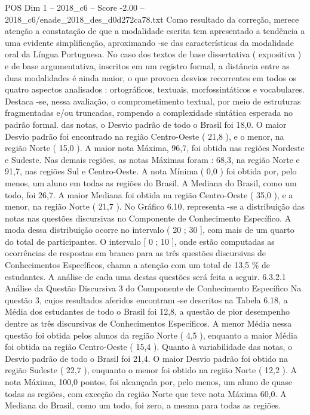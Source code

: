 \begin{textsample}{POS Dim 1 – 2018\_c6 – Score -2.00 – 2018\_c6/enade\_2018\_des\_d0d272ca78.txt}
Como resultado da correção, merece atenção a constatação de que a modalidade escrita tem apresentado a tendência a uma evidente simplificação, aproximando -se das características da modalidade oral da Língua Portuguesa.
No caso dos textos de base dissertativa ( expositiva ) e de base argumentativa, inscritos em um registro formal, a distância entre as duas modalidades é ainda maior, o que provoca desvios recorrentes em todos os quatro aspectos analisados : ortográficos, textuais, morfossintáticos e vocabulares.
Destaca -se, nessa avaliação, o comprometimento textual, por meio de estruturas fragmentadas e/ou truncadas, rompendo a complexidade sintática esperada no padrão formal. das notas, o Desvio padrão de todo o Brasil foi 18,0.
O maior Desvio padrão foi encontrado na região Centro-Oeste ( 21,8 ), e o menor, na região Norte ( 15,0 ).
A maior nota Máxima, 96,7, foi obtida nas regiões Nordeste e Sudeste.
Nas demais regiões, as notas Máximas foram : 68,3, na região Norte e 91,7, nas regiões Sul e Centro-Oeste.
A nota Mínima ( 0,0 ) foi obtida por, pelo menos, um aluno em todas as regiões do Brasil.
A Mediana do Brasil, como um todo, foi 26,7.
A maior Mediana foi obtida na região Centro-Oeste ( 35,0 ), e a menor, na região Norte ( 21,7 ).
No Gráfico 6.10, representa -se a distribuição das notas nas questões discursivas no Componente de Conhecimento Específico.
A moda dessa distribuição ocorre no intervalo ( 20 ; 30 ], com mais de um quarto do total de participantes.
O intervalo [ 0 ; 10 ], onde estão computadas as ocorrências de respostas em branco para as três questões discursivas de Conhecimentos Específicos, chama a atenção com um total de 13,5 \% de estudantes.
A análise de cada uma destas questões será feita a seguir. 6.3.2.1 Análise da Questão Discursiva 3 do Componente de Conhecimento Específico Na questão 3, cujos resultados aferidos encontram -se descritos na Tabela 6.18, a Média dos estudantes de todo o Brasil foi 12,8, a questão de pior desempenho dentre as três discursivas de Conhecimentos Específicos.
A menor Média nessa questão foi obtida pelos alunos da região Norte ( 4,5 ), enquanto a maior Média foi obtida na região Centro-Oeste ( 15,4 ).
Quanto à variabilidade das notas, o Desvio padrão de todo o Brasil foi 21,4.
O maior Desvio padrão foi obtido na região Sudeste ( 22,7 ), enquanto o menor foi obtido na região Norte ( 12,2 ).
A nota Máxima, 100,0 pontos, foi alcançada por, pelo menos, um aluno de quase todas as regiões, com exceção da região Norte que teve nota Máxima 60,0.
A Mediana do Brasil, como um todo, foi zero, a mesma para todas as regiões.

\end{textsample}
